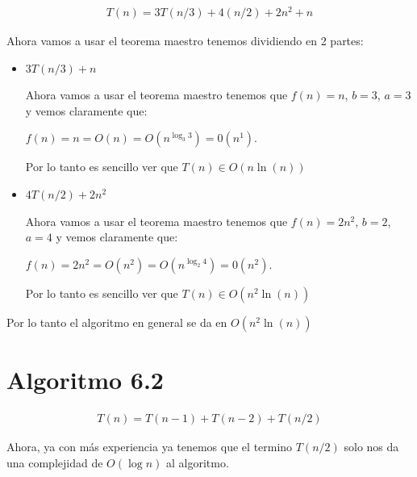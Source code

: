 \documentclass[12pt, fleqn]{article}                            %
\theoremstyle{break}                                            %
\begin{document}
        \begin{align*}
            T(n) = 3T(n / 3) + 4(n / 2) + 2n^2 + n
        \end{align*}

        Ahora vamos a usar el teorema maestro tenemos dividiendo en 2 partes:

        \begin{itemize}
            
            \item 
                $3T(n / 3) + n$
                
                Ahora vamos a usar el teorema maestro tenemos que $f(n) = n$, $b = 3$, $a = 3$
                y vemos claramente que: 

                $f(n) = n = O(n) = O(n^{\log_3 3}) = 0(n^1)$.

                Por lo tanto es sencillo ver que $T(n) \in O(n \ln(n))$ 

            \item 
                $4T(n / 2) + 2n^2$
                
                Ahora vamos a usar el teorema maestro tenemos que $f(n) = 2n^2$, $b = 2$, $a = 4$
                y vemos claramente que: 

                $f(n) = 2n^2 = O(n^2) = O(n^{\log_2 4}) = 0(n^2)$.

                Por lo tanto es sencillo ver que $T(n) \in O(n^2 \ln(n))$ 

        \end{itemize}

        Por lo tanto el algoritmo en general se da en $O(n^2 \ln(n))$



    \clearpage
    \section{Algoritmo 6.2}

        \begin{align*}
            T(n) = T(n-1) + T(n-2) + T(n/2)
        \end{align*}

        Ahora, ya con más experiencia ya tenemos que el termino $T(n/2)$ solo nos da
        una complejidad de $O(\log n)$ al algoritmo.
\end{document}
